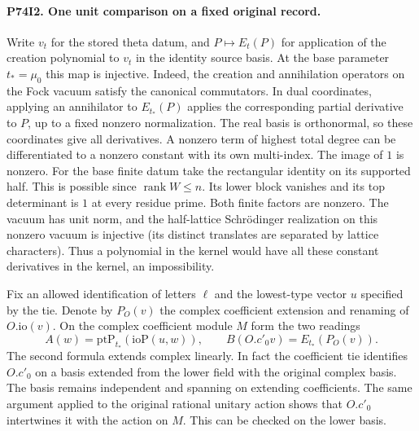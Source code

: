 \paragraph{P74I2. One unit comparison on a fixed original record.}
Write $v_t$ for the stored theta datum, and $P\mapsto E_t(P)$ for
application of the creation polynomial to $v_t$ in the identity
source basis. At the base parameter $t_*=\mu_0$ this map is injective.
Indeed, the creation and annihilation operators on the Fock vacuum
satisfy the canonical commutators. In dual coordinates, applying
an annihilator to $E_{t_*}(P)$ applies the corresponding partial
derivative to $P$, up to a fixed nonzero normalization. The real
basis is orthonormal, so these coordinates give all derivatives.
A nonzero term of highest total degree can be differentiated to a
nonzero constant with its own multi-index. The image of $1$ is
nonzero. For the base finite datum take the rectangular identity on its
supported half. This is possible since $\operatorname{rank}W\le n$.
Its lower block vanishes and its top determinant is $1$ at every
residue prime. Both finite factors are nonzero. The vacuum has
unit norm, and the half-lattice Schrödinger realization on this
nonzero vacuum is injective (its distinct translates are separated
by lattice characters). Thus a polynomial in the kernel would have
all these constant derivatives in the kernel, an impossibility.

Fix an allowed identification of letters $\ell$ and the lowest-type
vector $u$ specified by the tie. Denote by $P_O(v)$ the complex
coefficient extension and renaming of $O.\mathrm{io}(v)$. On the
complex coefficient module $M$ form the two readings
\[
 A(w)=\mathrm{ptP}_{t_*}(\mathrm{ioP}(u,w)),\qquad
 B(O.c'_0 v)=E_{t_*}(P_O(v)).
\]
The second formula extends complex linearly. In fact the coefficient
tie identifies $O.c'_0$ on a basis extended from the lower field
with the original complex basis. The basis remains independent and
spanning on extending coefficients. The same argument applied to
the original rational unitary action shows that $O.c'_0$ intertwines
it with the action on $M$. This can be checked on the lower basis.

